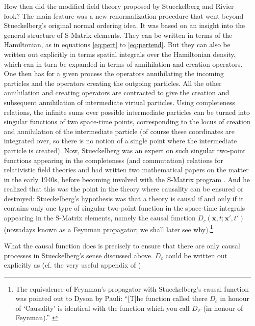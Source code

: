 \documentclass[12pt,a4paper]{article}
\begin{document}
How then did the modified field theory proposed by Stueckelberg and Rivier look? The main feature was a new renormalization procedure that went beyond Stueckelberg's original normal ordering idea. It was based on an insight into the general structure of S-Matrix elements. They can be written in terms of the Hamiltonian, as in equations \ref{eq:pert} to \ref{eq:pertend}. But they can also be written out explicitly in terms spatial integrals over the Hamiltonian density, which can in turn be expanded in terms of annihilation and creation operators. One then has for a given process the operators annihilating the incoming particles and the operators creating the outgoing particles. All the other annihilation and creating operators are contracted to give the creation and subsequent annihilation of intermediate virtual particles. Using completeness relations, the infinite sums over possible intermediate particles can be turned into singular functions of two space-time points, corresponding to the locus of creation and annihilation of the intermediate particle (of course these coordinates are integrated over, so there is no notion of a single point where the intermediate particle is created). Now, Stueckelberg was an expert on such singular two-point functions appearing in the completeness (and commutation) relations for relativistic field theories and had written two mathematical papers on the matter in the early 1940s, before becoming involved with the S-Matrix program \citep{stueckelberg_1942_solutions,stueckelberg_1942_solutionsb}. And he realized that this was the point in the theory where causality can be ensured or destroyed: Stueckelberg's hypothesis was that a theory is causal if and only if it contains only one type of singular two-point function in the space-time integrals appearing in the S-Matrix elements, namely the causal function $D_c (\mathbf{x}, t; \mathbf{x}', t')$ (nowadays known as a Feynman propagator; we shall later see why).\footnote{The equivalence of Feynman's propagator with Stueckelberg's causal function was pointed out to Dyson by Pauli: ``[T]he function called there $D_c$ in honour of `Causality' is identical with the function which you call $D_F$ (in honour of Feynman).'' \citep[p. 595]{meyenn_1993_wissenschaftlicher}}

What the causal function does is precisely to ensure that there are only causal processes in Stueckelberg's sense discussed above. $D_c$ could be written out explicitly as (cf. the very useful appendix of \citep{rivier_1949_une-methode})
\end{document}
